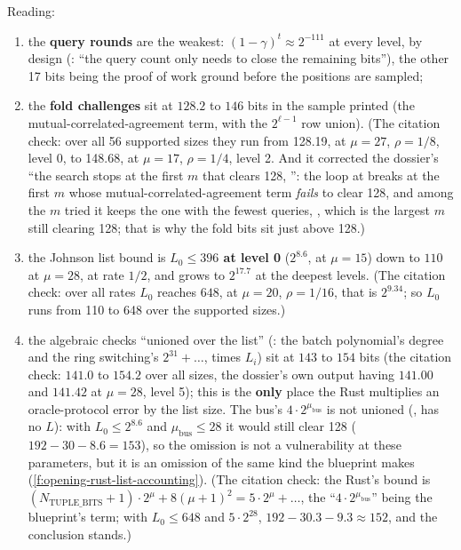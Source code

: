 Reading:
\begin{enumerate}
\item the \textbf{query rounds} are the weakest: $(1 − γ)^t ≈ 2^{-111}$ at every level, by design
  (: ``the query count only needs to close the remaining 
  bits''), the other 17 bits being the proof of work ground before the positions are sampled;
\item the \textbf{fold challenges} sit at $128.2$ to $146$ bits in the sample printed (the
  mutual-correlated-agreement term, with the $2^{ℓ−1}$ row union). (The citation check: over all 56
  supported sizes they run from 128.19, at $μ = 27$, $ρ = 1/8$, level 0, to 148.68, at $μ = 17$,
  $ρ = 1/4$, level 2. And it corrected the dossier's ``the search stops at the first $m$ that clears
  128, '': the loop at  breaks at the first $m$ whose
  mutual-correlated-agreement term \emph{fails} to clear 128, and among the $m$ tried it keeps the one
  with the fewest queries, , which is the largest $m$ still clearing 128; that is why the
  fold bits sit just above 128.)
\item the Johnson list bound is \textbf{$L_0 ≤ 396$ at level 0} ($2^{8.6}$, at $μ = 15$) down to
  $110$ at $μ = 28$, at rate $1/2$, and grows to $2^{17.7}$ at the deepest levels. (The citation check:
  over all rates $L_0$ reaches $648$, at $μ = 20$, $ρ = 1/16$, that is $2^{9.34}$; so $L_0$ runs from
  110 to 648 over the supported sizes.)
\item the algebraic checks ``unioned over the list'' (: the batch polynomial's degree
  and the ring switching's $2^{31} + …$, times $L_i$) sit at $143$ to $154$ bits (the citation check:
  $141.0$ to $154.2$ over all sizes, the dossier's own output having $141.00$ and $141.42$ at
  $μ = 28$, level 5); this is the \textbf{only} place the Rust multiplies an oracle-protocol error by
  the list size. The bus's $4·2^{μ_{\mathrm{bus}}}$ is not unioned (,
   has no $L$): with $L_0 ≤ 2^{8.6}$ and $μ_{\mathrm{bus}} ≤ 28$ it would
  still clear 128 ($192 − 30 − 8.6 = 153$), so the omission is not a vulnerability at these
  parameters, but it is an omission of the same kind the blueprint makes
  (\cref{f:opening-rust-list-accounting}). (The citation check: the Rust's bound is
  $(N_{\mathrm{TUPLE\_BITS}} + 1)·2^μ + 8(μ+1)^2 = 5·2^μ + …$, the ``$4·2^{μ_{\mathrm{bus}}}$'' being
  the blueprint's term; with $L_0 ≤ 648$ and $5·2^{28}$, $192 − 30.3 − 9.3 ≈ 152$, and the conclusion
  stands.)
\end{enumerate}

